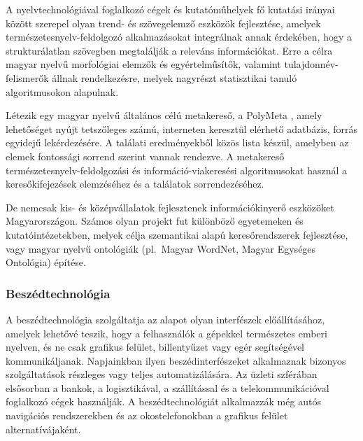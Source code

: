 \begin{multicols}{2}
A nyelvtechnológiával foglalkozó cégek és kutatóműhelyek fő kutatási irányai között szerepel olyan trend- és szövegelemző esz\-kö\-zök fejlesztése, amelyek ter\-mé\-sze\-tes\-nyelv-feldolgozó alkalmazásokat integrálnak annak érdekében, hogy a strukturálatlan szövegben megtalálják a releváns információkat. Erre a célra magyar nyelvű morfológiai elemzők és egyértelműsítők, valamint tulajdonnév-felismerők állnak rendelkezésre, melyek nagyrészt statisztikai tanuló algoritmusokon alapulnak.

Létezik egy magyar nyelvű általános célú metakereső, a PolyMeta \cite{polymeta}, amely le\-he\-tő\-sé\-get nyújt tetszőleges számú, interneten keresztül elérhető adatbázis, forrás egyidejű lekérdezésére. A találati eredményekből közös lista készül, amelyben az elemek fontossági sorrend szerint vannak rendezve. A metakereső természetesnyelv-feldolgozási és információ-viakeresési algoritmusokat használ a keresőkifejezések elemzéséhez és a találatok sorrendezéséhez.

De nemcsak kis- és középvállalatok fej\-lesz\-te\-nek információkinyerő eszközöket Magyarországon. Számos olyan projekt fut különböző egyetemeken és kutatóintézetekben, melyek célja szemantikai alapú keresőrendszerek fejlesztése, vagy magyar nyelvű ontológiák (pl.~Ma\-gyar WordNet, Magyar Egységes Ontológia) építése. 

\subsubsection{Beszédtechnológia}

A beszédtechnológia szolgáltatja az alapot olyan interfészek előállításához, amelyek lehetővé teszik, hogy a felhasználók a gépekkel természetes emberi nyelven, és ne csak grafikus felület, billentyűzet vagy egér segítségével kommunikáljanak. Napjainkban ilyen beszédinterfészeket al\-kal\-maz\-nak bizonyos szolgáltatások részleges vagy teljes automatizálására. Az üzleti szférában elsősorban a bankok, a logisztikával, a szállítással és a telekommunikációval foglalkozó cégek használják. A beszédtechnológiát alkalmazzák még autós navigációs rendszerekben és az okostelefonokban a grafikus felület alternatívájaként.



\end{multicols}
